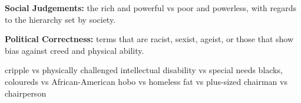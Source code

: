 \documentclass[../main.tex]{subfiles}
\begin{document}
        \textbf{Social Judgements:} the rich and powerful vs poor and powerless, with regards to the hierarchy set by society.

        \textbf{Political Correctness:} terms that are racist, sexist, ageist, or those that show bias against creed and physical ability. 
        \begin{exe}
            \ex cripple vs physically challenged
            \ex intellectual disability vs special needs
            \ex blacks, coloureds vs African-American
            \ex hobo vs homeless
            \ex fat vs plus-sized
            \ex chairman vs chairperson
        \end{exe}
        
\end{document}
